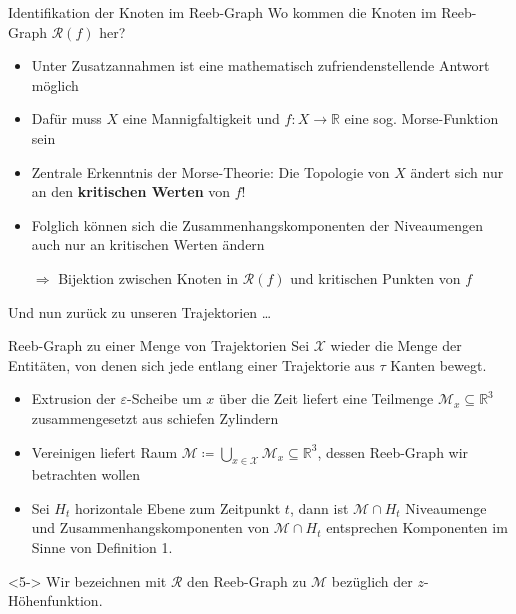 \documentclass[
wide,
10pt,
xcolor={x11names,svgnames},
hyperref={pdfauthor={Jannes Bantje},colorlinks,urlcolor=maincolor,hidelinks=false,linkcolor=maincolor},
pantone312, 	%
euler-digits,
]{beamer}
\newcommand{\bet}[1]{\textbf{\color{maincolor}#1}}
\theoremstyle{definition}
\begin{document}
\begin{frame}{Identifikation der Knoten im Reeb-Graph}
    Wo kommen die Knoten im Reeb-Graph $\mathcal{R}(f)$ her? \pause
    \begin{itemize}[<+->]
        \item Unter Zusatzannahmen ist eine mathematisch zufriendenstellende Antwort möglich
        \item Dafür muss $X$ eine Mannigfaltigkeit und $f \colon X \to \mathbb{R}$ eine sog. Morse-Funktion sein
        \item Zentrale Erkenntnis der Morse-Theorie: Die Topologie von $X$ ändert sich nur an den \bet{kritischen Werten} von $f$!
        \item Folglich können sich die Zusammenhangskomponenten der Niveaumengen auch nur an kritischen Werten ändern
        \item[$\Rightarrow$] Bijektion zwischen Knoten in $\mathcal{R}(f)$ und kritischen Punkten von $f$
    \end{itemize}
    \begin{center}
        \large Und nun zurück zu unseren Trajektorien \ldots
    \end{center}
\end{frame}

\begin{frame}{Reeb-Graph zu einer Menge von Trajektorien}
    Sei $\mathcal{X}$ wieder die Menge der Entitäten, von denen sich jede entlang einer Trajektorie aus $\tau$ Kanten bewegt.
    \begin{itemize}
        \item<2-> Extrusion der $\varepsilon$-Scheibe um $x$ über die Zeit liefert eine Teilmenge $\mathcal{M}_x \subseteq \mathbb{R}^3$ zusammengesetzt aus schiefen Zylindern
        \item<3-> Vereinigen liefert Raum $\mathcal{M} \coloneqq \bigcup_{x \in \mathcal{X}} \mathcal{M}_x  \subseteq \mathbb{R}^3$, dessen Reeb-Graph wir betrachten wollen
        \item<4-> Sei $H_t$ horizontale Ebene zum Zeitpunkt $t$, dann ist $\mathcal{M} \cap H_t$ Niveaumenge und Zusammenhangskomponenten von $\mathcal{M} \cap H_t$ entsprechen Komponenten im Sinne von Definition 1.
    \end{itemize}
    \begin{definition}<5->
        Wir bezeichnen mit $\mathcal{R}$ den Reeb-Graph zu $\mathcal{M}$ bezüglich der $z$-Höhenfunktion.
    \end{definition}
\end{frame}
\end{document}
